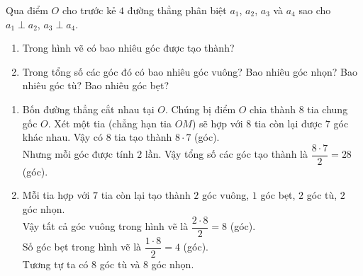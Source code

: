 \begin{bt}%
Qua điểm $O$ cho trước kẻ $4$ đường thẳng phân biệt $a_1$, $a_2$, $a_3$ và $a_4$ sao cho $a_1 \perp a_2$, $a_3 \perp a_4$.
\begin{enumerate}
	\item Trong hình vẽ có bao nhiêu góc được tạo thành?
	\item Trong tổng số các góc đó có bao nhiêu góc vuông? Bao nhiêu góc nhọn? Bao nhiêu góc tù? Bao nhiêu góc bẹt?
\end{enumerate} 
\loigiai
{
	\begin{center}
	\end{center}
    \begin{enumerate}
	\item Bốn đường thẳng cắt nhau tại $O$. Chúng bị điểm $O$ chia thành $8$ tia chung gốc $O$. Xét một tia (chẳng hạn tia $OM$) sẽ hợp với $8$ tia còn lại được $7$ góc khác nhau. Vậy có $8$ tia tạo thành $8 \cdot 7$ (góc).\\
	Nhưng mỗi góc được tính $2$ lần. Vậy tổng số các góc tạo thành là $\dfrac{8 \cdot 7}{2}=28$ (góc).
	\item Mỗi tia hợp với $7$ tia còn lại tạo thành $2$ góc vuông, $1$ góc bẹt, $2$ góc tù, $2$ góc nhọn.\\
	Vậy tất cả góc vuông trong hình vẽ là $\dfrac{2 \cdot 8}{2}=8$ (góc).\\
	Số góc bẹt trong hình vẽ là $\dfrac{1\cdot 8}{2}=4$ (góc).\\
	Tương tự ta có $8$ góc tù và $8$ góc nhọn.
\end{enumerate}
}
\end{bt}

